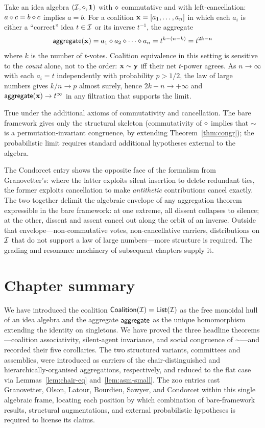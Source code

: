 \formalclaim
Take an idea algebra $(\mathcal{I},\mathbin{\diamond},\mathbf{1})$ with $\mathbin{\diamond}$ commutative and with
left-cancellation: $a \mathbin{\diamond} c = b \mathbin{\diamond} c$ implies $a = b$.
For a coalition $\mathbf{x} = [a_1, \ldots, a_n]$ in which each $a_i$ is
either a ``correct'' idea $t \in \mathcal{I}$ or its inverse $t^{-1}$,
the aggregate
\[
  \mathsf{aggregate}(\mathbf{x}) = a_1 \mathbin{\diamond} a_2 \mathbin{\diamond} \cdots \mathbin{\diamond} a_n
  = t^{k - (n-k)} = t^{2k - n}
\]
where $k$ is the number of $t$-votes. Coalition equivalence in this
setting is sensitive to the \emph{count} alone, not to the order:
$\mathbf{x} \sim \mathbf{y}$ iff their net $t$-power agrees. As $n \to \infty$
with each $a_i = t$ independently with probability $p > 1/2$, the
law of large numbers gives $k/n \to p$ almost surely, hence
$2k - n \to +\infty$ and $\mathsf{aggregate}(\mathbf{x}) \to t^{\infty}$ in any
filtration that supports the limit.

\formalstatus
True under the additional axioms of commutativity and cancellation.
The bare framework gives only the structural skeleton (commutativity
of $\mathbin{\diamond}$ implies that $\sim$ is a permutation-invariant
congruence, by extending Theorem~\ref{thm:congr}); the probabilistic
limit requires standard additional hypotheses external to the algebra.

\litcomment
The Condorcet entry shows the opposite face of the formalism from
Granovetter's: where the latter exploits silent insertion to delete
redundant ties, the former exploits cancellation to make
\emph{antithetic} contributions cancel exactly. The two together
delimit the algebraic envelope of any aggregation theorem
expressible in the bare framework: at one extreme, all dissent
collapses to silence; at the other, dissent and assent cancel out
along the orbit of an inverse. Outside that envelope---non-commutative
votes, non-cancellative carriers, distributions on $\mathcal{I}$ that do
not support a law of large numbers---more structure is required.
The grading and resonance machinery of subsequent chapters supply it.

\section*{Chapter summary}

We have introduced the coalition $\mathsf{Coalition}(\mathcal{I}) =
\mathsf{List}(\mathcal{I})$ as the free monoidal hull of an idea algebra and the
aggregate $\mathsf{aggregate}$ as the unique homomorphism extending the
identity on singletons. We have proved the three headline
theorems---coalition associativity, silent-agent invariance, and
social congruence of $\sim$---and recorded their five corollaries.
The two structured variants, committees and assemblies, were
introduced as carriers of the chair-distinguished and
hierarchically-organised aggregations, respectively, and reduced to
the flat case via Lemmas~\ref{lem:chair-eq} and~\ref{lem:asm-small}.
The zoo entries cast Granovetter, Olson, Latour, Bourdieu, Sawyer,
and Condorcet within this single algebraic frame, locating each
position by which combination of bare-framework results, structural
augmentations, and external probabilistic hypotheses is required to
license its claims.

